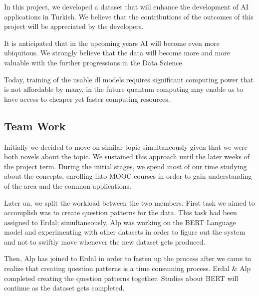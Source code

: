 \documentclass{mefsdp}
\begin{document}
	In this project, we developed a dataset that will enhance the development of AI applications in Turkish. We believe that the contributions of the outcomes of this project will be appreciated by the developers. \newline \par
	
	It is anticipated that in the upcoming years AI will become even more ubiquitous. We strongly believe that the data will become more and more valuable with the further progressions in the Data Science. \newline \par
	
	Today, training of the usable \gls{dl} models requires significant computing power that is not affordable by many, in the future quantum computing may enable us to have access to cheaper yet faster computing resources. \newline \par
	
	\subsection{Team Work}
	Initially we decided to move on similar topic simultaneously given that we were both novels about the topic. We sustained this approach until the later weeks of the project term. During the initial stages, we spend most of our time studying about the concepts, enrolling into MOOC courses in order to gain understanding of the area and the common applications. \newline \par
	
	Later on, we split the workload between the two members. First task we aimed to accomplish was to create question patterns for the data. This task had been assigned to Erdal; simultaneously, Alp was working on the BERT Language model and experimenting with other datasets in order to figure out the system and not to swiftly move whenever the new dataset gets produced. \newline \par
	
	Then, Alp has joined to Erdal in order to fasten up the process after we came to realize that creating question patterns is a time consuming process. Erdal \& Alp completed creating the question patterns together. Studies about BERT will continue as the dataset gets completed.\newline \par
	
\end{document}
